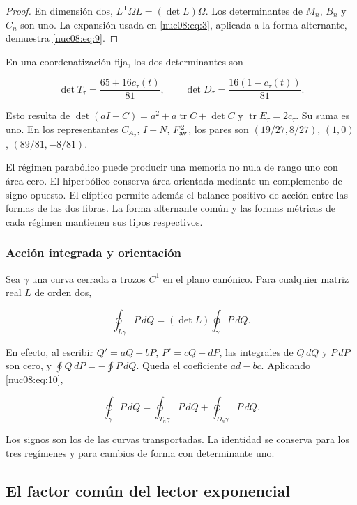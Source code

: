 \begin{proof}
En dimensión dos, \(L^\mathsf T\Omega L=(\det L)\Omega\). Los determinantes de \(M_n\), \(B_n\) y \(C_n\) son uno. La expansión usada en \eqref{nuc08:eq:3}, aplicada a la forma alternante, demuestra \eqref{nuc08:eq:9}.
\end{proof}

En una coordenatización fija, los dos determinantes son

\begin{equation}
\det T_\tau=\frac{65+16c_\tau(t)}{81},\qquad
\det D_\tau=\frac{16(1-c_\tau(t))}{81}.
\label{nuc08:eq:10}
\end{equation}

Esto resulta de \(\det(aI+C)=a^2+a\operatorname{tr}C+\det C\) y \(\operatorname{tr}E_\tau=2c_\tau\). Su suma es uno. En los representantes \(C_{A_2}\), \(I+N\), \(F_{\rm av}^2\), los pares son \((19/27,8/27)\), \((1,0)\), \((89/81,-8/81)\).

El régimen parabólico puede producir una memoria no nula de rango uno con área cero. El hiperbólico conserva área orientada mediante un complemento de signo opuesto. El elíptico permite además el balance positivo de acción entre las formas de las dos fibras. La forma alternante común y las formas métricas de cada régimen mantienen sus tipos respectivos.

\subsubsection{Acción integrada y orientación}

Sea \(\gamma\) una curva cerrada a trozos \(C^1\) en el plano canónico. Para cualquier matriz real \(L\) de orden dos,

\[
\oint_{L\gamma}P\,dQ=(\det L)\oint_\gamma P\,dQ.
\]

En efecto, al escribir \(Q'=aQ+bP\), \(P'=cQ+dP\), las integrales de \(Q\,dQ\) y \(P\,dP\) son cero, y \(\oint Q\,dP=-\oint P\,dQ\). Queda el coeficiente \(ad-bc\). Aplicando \eqref{nuc08:eq:10},

\begin{equation}
\boxed{\oint_\gamma P\,dQ
=\oint_{T_n\gamma}P\,dQ+\oint_{D_n\gamma}P\,dQ.}
\label{nuc08:eq:11}
\end{equation}

Los signos son los de las curvas transportadas. La identidad se conserva para los tres regímenes y para cambios de forma con determinante uno.

\subsection{El factor común del lector exponencial}

